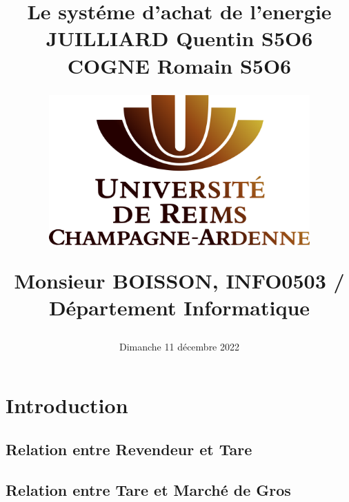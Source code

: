 \documentclass[a4paper, 11pt, french]{report}
\begin{document}
\begin{title}

\title{
    {\Huge Le systéme d'achat de l'energie}\\
    \vspace{1 cm}
    {\LARGE JUILLIARD Quentin S5O6}\\
    {\LARGE COGNE Romain S5O6}\\
    \vspace{2.5 cm}
    {\includegraphics[width=100mm, height=70mm]{logo_univ}}\\
    \vspace{2.5 cm}
    {\Large Monsieur BOISSON, INFO0503 / Département Informatique}\\
    \vspace{1 cm}
    {\date{\Large Dimanche 11 décembre 2022}}}
\end{title}

\maketitle
\tableofcontents
\clearpage



\section{Introduction}


\subsection{Relation entre Revendeur et Tare}


\subsection{Relation entre Tare et Marché de Gros}

\end{document}
